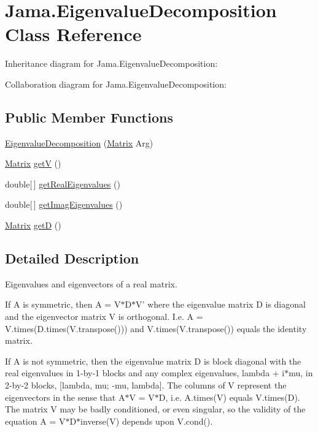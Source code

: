 \hypertarget{class_jama_1_1_eigenvalue_decomposition}{\section{Jama.\+Eigenvalue\+Decomposition Class Reference}
\label{class_jama_1_1_eigenvalue_decomposition}
}


Inheritance diagram for Jama.\+Eigenvalue\+Decomposition\+:


Collaboration diagram for Jama.\+Eigenvalue\+Decomposition\+:
\subsection*{Public Member Functions}
\begin{DoxyCompactItemize}
\item 
\hyperlink{class_jama_1_1_eigenvalue_decomposition_a48d5e35fca42407513644a0abb1c6df2}{Eigenvalue\+Decomposition} (\hyperlink{class_jama_1_1_matrix}{Matrix} Arg)
\item 
\hyperlink{class_jama_1_1_matrix}{Matrix} \hyperlink{class_jama_1_1_eigenvalue_decomposition_a16cfd86fa74288c8d27536460d70df7b}{get\+V} ()
\item 
double\mbox{[}$\,$\mbox{]} \hyperlink{class_jama_1_1_eigenvalue_decomposition_a90b0d4e795512f334c5294e15b31ea93}{get\+Real\+Eigenvalues} ()
\item 
double\mbox{[}$\,$\mbox{]} \hyperlink{class_jama_1_1_eigenvalue_decomposition_adc0af6cb4a4a6c6f01903d979820d585}{get\+Imag\+Eigenvalues} ()
\item 
\hyperlink{class_jama_1_1_matrix}{Matrix} \hyperlink{class_jama_1_1_eigenvalue_decomposition_a3120d34f74224c1093cc9bc03f245ee1}{get\+D} ()
\end{DoxyCompactItemize}


\subsection{Detailed Description}
Eigenvalues and eigenvectors of a real matrix. 

If A is symmetric, then A = V$\ast$\+D$\ast$\+V' where the eigenvalue matrix D is diagonal and the eigenvector matrix V is orthogonal. I.\+e. A = V.\+times(D.\+times(V.\+transpose())) and V.\+times(V.\+transpose()) equals the identity matrix. 

If A is not symmetric, then the eigenvalue matrix D is block diagonal with the real eigenvalues in 1-\/by-\/1 blocks and any complex eigenvalues, lambda + i$\ast$mu, in 2-\/by-\/2 blocks, \mbox{[}lambda, mu; -\/mu, lambda\mbox{]}. The columns of V represent the eigenvectors in the sense that A$\ast$\+V = V$\ast$\+D, i.\+e. A.\+times(\+V) equals V.\+times(\+D). The matrix V may be badly conditioned, or even singular, so the validity of the equation A = V$\ast$\+D$\ast$inverse(V) depends upon V.\+cond(). 

